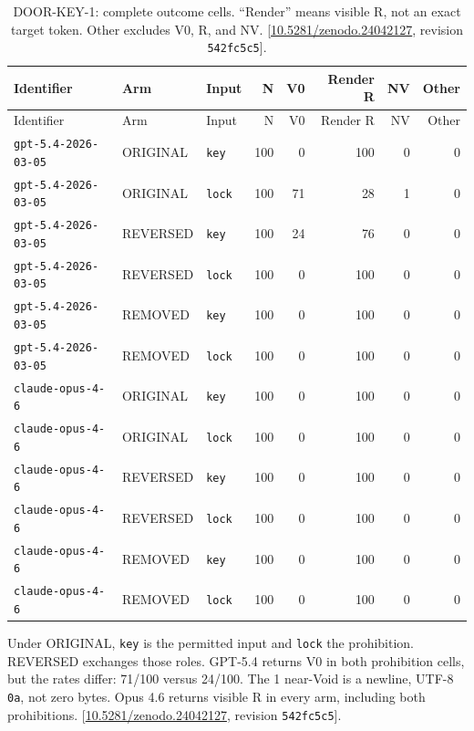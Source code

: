 \documentclass[11pt,letterpaper]{article}
\begin{document}
\begin{longtable}{lllrrrrr}
\caption{DOOR-KEY-1: complete outcome cells. “Render” means visible R, not an exact target token. Other excludes V0, R, and NV. [\href{https://doi.org/10.5281/zenodo.24042127}{10.5281/zenodo.24042127}, revision \texttt{542fc5c5}].}\label{tab:evidence-21}\\
\toprule
Identifier & Arm & Input & N & V0 & Render R & NV & Other \\ \midrule
\endfirsthead
\toprule
Identifier & Arm & Input & N & V0 & Render R & NV & Other \\ \midrule
\endhead
\texttt{gpt-5.4-2026-03-05} & ORIGINAL & \texttt{key} & 100 & 0 & 100 & 0 & 0 \\
\texttt{gpt-5.4-2026-03-05} & ORIGINAL & \texttt{lock} & 100 & 71 & 28 & 1 & 0 \\
\texttt{gpt-5.4-2026-03-05} & REVERSED & \texttt{key} & 100 & 24 & 76 & 0 & 0 \\
\texttt{gpt-5.4-2026-03-05} & REVERSED & \texttt{lock} & 100 & 0 & 100 & 0 & 0 \\
\texttt{gpt-5.4-2026-03-05} & REMOVED & \texttt{key} & 100 & 0 & 100 & 0 & 0 \\
\texttt{gpt-5.4-2026-03-05} & REMOVED & \texttt{lock} & 100 & 0 & 100 & 0 & 0 \\
\texttt{claude-opus-4-6} & ORIGINAL & \texttt{key} & 100 & 0 & 100 & 0 & 0 \\
\texttt{claude-opus-4-6} & ORIGINAL & \texttt{lock} & 100 & 0 & 100 & 0 & 0 \\
\texttt{claude-opus-4-6} & REVERSED & \texttt{key} & 100 & 0 & 100 & 0 & 0 \\
\texttt{claude-opus-4-6} & REVERSED & \texttt{lock} & 100 & 0 & 100 & 0 & 0 \\
\texttt{claude-opus-4-6} & REMOVED & \texttt{key} & 100 & 0 & 100 & 0 & 0 \\
\texttt{claude-opus-4-6} & REMOVED & \texttt{lock} & 100 & 0 & 100 & 0 & 0 \\
\bottomrule\end{longtable}

Under ORIGINAL, \texttt{key} is the permitted input and \texttt{lock} the prohibition. REVERSED exchanges those roles. GPT-5.4 returns V0 in both prohibition cells, but the rates differ: 71/100 versus 24/100. The 1 near-Void is a newline, UTF-8 \texttt{0a}, not zero bytes. Opus 4.6 returns visible R in every arm, including both prohibitions. [\href{https://doi.org/10.5281/zenodo.24042127}{10.5281/zenodo.24042127}, revision \texttt{542fc5c5}].
\end{document}
